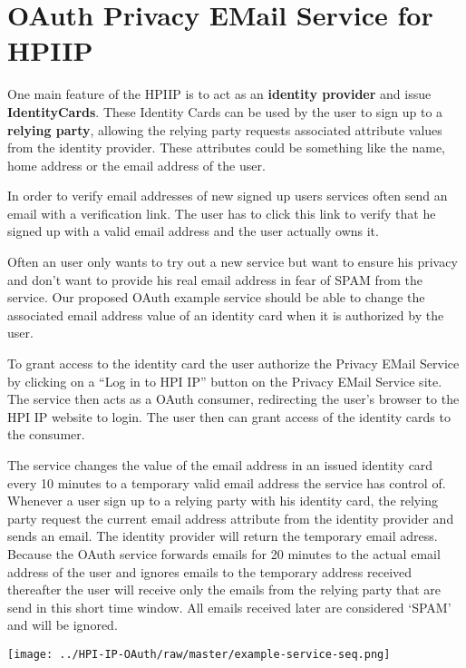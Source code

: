 \section{OAuth Privacy EMail Service for HPIIP}

One main feature of the HPIIP is to act as an
\textbf{identity provider} and issue \textbf{IdentityCards}. These
Identity Cards can be used by the user to sign up to a
\textbf{relying party}, allowing the relying party requests
associated attribute values from the identity provider. These
attributes could be something like the name, home address or the
email address of the user.

In order to verify email addresses of new signed up users services
often send an email with a verification link. The user has to click
this link to verify that he signed up with a valid email address
and the user actually owns it.

Often an user only wants to try out a new service but want to
ensure his privacy and don't want to provide his real email address
in fear of SPAM from the service. Our proposed OAuth example
service should be able to change the associated email address value
of an identity card when it is authorized by the user.

To grant access to the identity card the user authorize the Privacy
EMail Service by clicking on a ``Log in to HPI IP'' button on the
Privacy EMail Service site. The service then acts as a OAuth
consumer, redirecting the user's browser to the HPI IP website to
login. The user then can grant access of the identity cards to the
consumer.

The service changes the value of the email address in an issued
identity card every 10 minutes to a temporary valid email address
the service has control of. Whenever a user sign up to a relying
party with his identity card, the relying party request the current
email address attribute from the identity provider and sends an
email. The identity provider will return the temporary email
adress. Because the OAuth service forwards emails for 20 minutes to
the actual email address of the user and ignores emails to the
temporary address received thereafter the user will receive only
the emails from the relying party that are send in this short time
window. All emails received later are considered `SPAM' and will be
ignored.

	\texttt{[image: ../HPI-IP-OAuth/raw/master/example-service-seq.png]}


